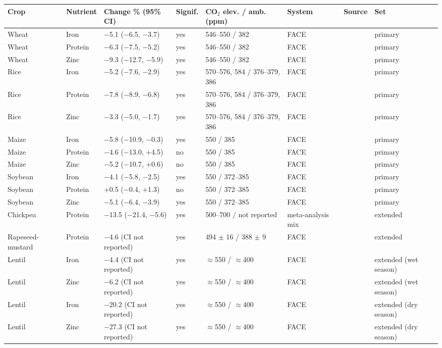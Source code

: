 \begin{tabular}{@{}llllllll@{}}
\toprule
Crop & Nutrient & Change \% (95\% CI) & Signif. & CO$_2$ elev. / amb. (ppm) & System & Source & Set \\
\midrule
Wheat & Iron & $-$5.1 ($-$6.5, $-$3.7) & yes & 546--550 / 382 & FACE & \citet{myers2014} & primary \\
Wheat & Protein & $-$6.3 ($-$7.5, $-$5.2) & yes & 546--550 / 382 & FACE & \citet{myers2014} & primary \\
Wheat & Zinc & $-$9.3 ($-$12.7, $-$5.9) & yes & 546--550 / 382 & FACE & \citet{myers2014} & primary \\
Rice & Iron & $-$5.2 ($-$7.6, $-$2.9) & yes & 570--576, 584 / 376--379, 386 & FACE & \citet{myers2014} & primary \\
Rice & Protein & $-$7.8 ($-$8.9, $-$6.8) & yes & 570--576, 584 / 376--379, 386 & FACE & \citet{myers2014} & primary \\
Rice & Zinc & $-$3.3 ($-$5.0, $-$1.7) & yes & 570--576, 584 / 376--379, 386 & FACE & \citet{myers2014} & primary \\
Maize & Iron & $-$5.8 ($-$10.9, $-$0.3) & yes & 550 / 385 & FACE & \citet{myers2014} & primary \\
Maize & Protein & $-$4.6 ($-$13.0, +4.5) & no & 550 / 385 & FACE & \citet{myers2014} & primary \\
Maize & Zinc & $-$5.2 ($-$10.7, +0.6) & no & 550 / 385 & FACE & \citet{myers2014} & primary \\
Soybean & Iron & $-$4.1 ($-$5.8, $-$2.5) & yes & 550 / 372--385 & FACE & \citet{myers2014} & primary \\
Soybean & Protein & +0.5 ($-$0.4, +1.3) & no & 550 / 372--385 & FACE & \citet{myers2014} & primary \\
Soybean & Zinc & $-$5.1 ($-$6.4, $-$3.9) & yes & 550 / 372--385 & FACE & \citet{myers2014} & primary \\
Chickpea & Protein & $-$13.5 ($-$21.4, $-$5.6) & yes & 500--700 / not reported & meta-analysis mix & \citet{medek2017} & extended \\
Rapeseed-mustard & Protein & $-$4.6 (CI not reported) & yes & 494 $\pm$ 16 / 388 $\pm$ 9 & FACE & \citet{hogy2010} & extended \\
Lentil & Iron & $-$4.4 (CI not reported) & yes & $\approx$550 / $\approx$400 & FACE & \citet{parvin2019} & extended (wet season) \\
Lentil & Zinc & $-$6.2 (CI not reported) & yes & $\approx$550 / $\approx$400 & FACE & \citet{parvin2019} & extended (wet season) \\
Lentil & Iron & $-$20.2 (CI not reported) & yes & $\approx$550 / $\approx$400 & FACE & \citet{parvin2019} & extended (dry season) \\
Lentil & Zinc & $-$27.3 (CI not reported) & yes & $\approx$550 / $\approx$400 & FACE & \citet{parvin2019} & extended (dry season) \\
\bottomrule
\end{tabular}
